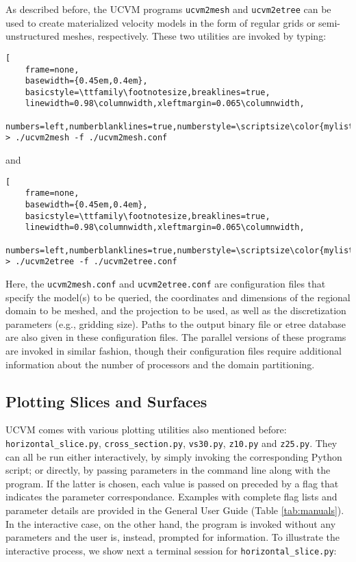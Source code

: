 As described before, the UCVM programs \texttt{ucvm2mesh} and \texttt{ucvm2etree} can be used to create materialized velocity models in the form of regular grids or semi-unstructured meshes, respectively. These two utilities are invoked by typing:

\begin{lstlisting}[
	frame=none,
	basewidth={0.45em,0.4em},
	basicstyle=\ttfamily\footnotesize,breaklines=true,
	linewidth=0.98\columnwidth,xleftmargin=0.065\columnwidth,
	numbers=left,numberblanklines=true,numberstyle=\scriptsize\color{mylistingnclr}]
> ./ucvm2mesh -f ./ucvm2mesh.conf
\end{lstlisting}

\noindent
and

\begin{lstlisting}[
	frame=none,
	basewidth={0.45em,0.4em},
	basicstyle=\ttfamily\footnotesize,breaklines=true,
	linewidth=0.98\columnwidth,xleftmargin=0.065\columnwidth,
	numbers=left,numberblanklines=true,numberstyle=\scriptsize\color{mylistingnclr}]
> ./ucvm2etree -f ./ucvm2etree.conf
\end{lstlisting}

\noindent
Here, the \texttt{ucvm2mesh.conf} and \texttt{ucvm2etree.conf} are configuration files that specify the model(s) to be queried, the coordinates and dimensions of the regional domain to be meshed, and the projection to be used, as well as the discretization parameters (e.g., gridding size). Paths to the output binary file or etree database are also given in these configuration files. The parallel versions of these programs are invoked in similar fashion, though their configuration files require additional information about the number of processors and the domain partitioning.

\subsection{Plotting Slices and Surfaces}

UCVM comes with various plotting utilities also mentioned before: \texttt{horizontal\_slice.py}, \texttt{cross\-\_section.py}, \texttt{vs30.py}, \texttt{z10.py} and \texttt{z25.py}. They can all be run either interactively, by simply invoking the corresponding Python script; or directly, by passing parameters in the command line along with the program. If the latter is chosen, each value is passed on preceded by a flag that indicates the parameter correspondance. Examples with complete flag lists and parameter details are provided in the General User Guide (Table \ref{tab:manuals}). In the interactive case, on the other hand, the program is invoked without any parameters and the user is, instead, prompted for information. To illustrate the interactive process, we show next a terminal session for \texttt{horizontal\_slice.py}:

